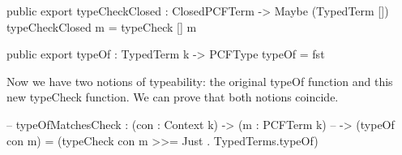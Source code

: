 \begin{code}
public export
typeCheckClosed : ClosedPCFTerm -> Maybe (TypedTerm [])
typeCheckClosed m = typeCheck [] m
\end{code}

\begin{code}
public export
typeOf : TypedTerm k -> PCFType
typeOf = fst
\end{code}


Now we have two notions of typeability: the original typeOf function and this new typeCheck function.
We can prove that both notions coincide.

\begin{code}
-- typeOfMatchesCheck : (con : Context k) -> (m : PCFTerm k) 
--                        -> (typeOf con m) = (typeCheck con m >>= Just . TypedTerms.typeOf)
\end{code}